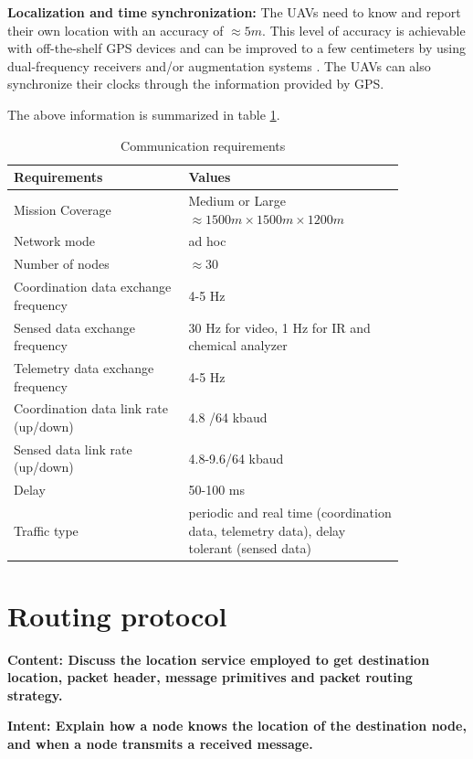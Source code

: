 \textbf{Localization and time synchronization:} The UAVs need to know and report their own location with an accuracy of $\approx 5 m$. This level of accuracy is achievable with off-the-shelf GPS devices and can be improved to a few centimeters by using dual-frequency receivers and/or augmentation systems \cite{gps_accuracy} . The UAVs can also synchronize their clocks through the information provided by GPS.

The above information is summarized in table \ref{tab:communication_requirements}.
\begin{table}
\caption{Communication requirements}
\label{tab:communication_requirements}
\begin{tabular}{|p{0.38\linewidth}|p{0.47\linewidth}|}
\toprule
Requirements & Values\\
\midrule
Mission Coverage & Medium or Large $\approx 1500 m \times 1500 m \times 1200 m$ \\
\midrule
Network mode & ad hoc \\
\midrule
Number of nodes &  $\approx 30 $ \\
\midrule
Coordination data exchange frequency &  4-5 Hz \cite{7463007}\\
\midrule
Sensed data exchange frequency & 30 Hz for video, 1 Hz for IR and chemical analyzer \cite{7463007}\\
\midrule
Telemetry data exchange frequency & 4-5 Hz \cite{7463007}\\
\midrule
Coordination data link rate (up/down) & 4.8 /64 kbaud \cite{7463007} \\
\midrule
Sensed data link rate (up/down) & 4.8-9.6/64 kbaud \cite{NASA_UAV_mission_parameters} \\
\midrule
Delay & 50-100 ms \cite{7463007}\\
\midrule
Traffic type & periodic and real time (coordination data, telemetry data), delay tolerant (sensed data) \\
\bottomrule
\end{tabular}
\end{table}

\section{Routing protocol} \label{routing_protocol}

\textbf{Content: Discuss the location service employed to get destination location, packet header, message primitives and packet routing strategy.}

\textbf{Intent: Explain how a node knows the location of the destination node, and when a node transmits a received message.
}

